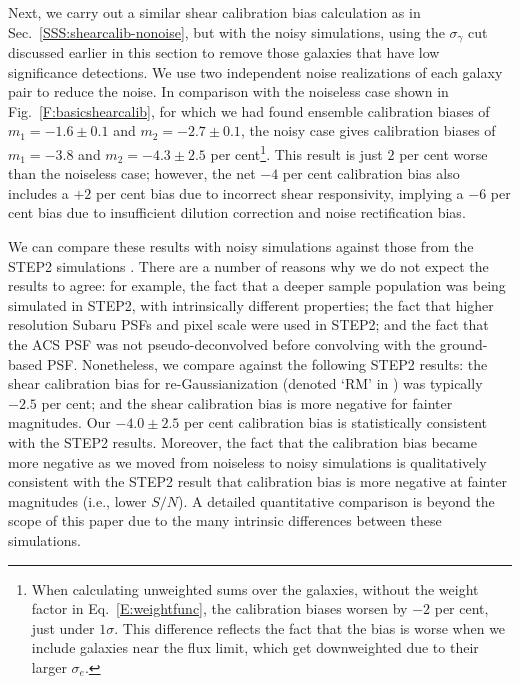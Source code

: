 \documentclass[twocolumn,useAMS,usenatbib]{mn2e}
\newcommand{\newtext}{}
\begin{document}
Next, we carry out a similar shear calibration bias calculation as in
Sec.~\ref{SSS:shearcalib-nonoise}, but with the noisy simulations,
using the $\sigma_\gamma$ cut
discussed earlier in this section to remove those galaxies that have
low significance detections.  %
We use
two independent noise realizations of each galaxy pair to reduce the noise.  In comparison with the
noiseless case shown in Fig.~\ref{F:basicshearcalib}, for which we had
found ensemble calibration biases of $m_1=-1.6 \pm 0.1$  and
$m_2=-2.7\pm 0.1$, the noisy case gives calibration biases of
$m_1=-3.8$ and $m_2=-4.3\pm 2.5$ per cent\footnote{\newtext{When calculating
    unweighted sums over the galaxies, without the weight factor in
    Eq.~\eqref{E:weightfunc}, the calibration biases worsen by $-2$
    per cent, just under $1\sigma$.  This difference reflects 
    the fact that the bias is worse when we include galaxies near the flux limit, which get downweighted due to their
    larger $\sigma_e$.}}.  This result is just $2$ per cent
worse than the noiseless case; however, the net $-4$ per cent
calibration bias also includes a $+2$ per cent bias due
to incorrect shear responsivity, implying a $-6$ per cent bias due to
insufficient dilution correction and noise rectification bias.%

We can compare these results with noisy simulations against those from
the STEP2 simulations \citep{2007MNRAS.376...13M}. There are a number
of reasons why we do not expect the results to agree: for example, the
fact that a deeper sample population was being simulated in STEP2, with
intrinsically different properties; the fact that higher resolution
Subaru PSFs and pixel scale were used in STEP2; and the fact that the ACS PSF was not
pseudo-deconvolved before convolving with the ground-based PSF.
Nonetheless, we compare against the following STEP2 results: the shear
calibration bias for re-Gaussianization (denoted `RM' in \citealt{2007MNRAS.376...13M}) was typically $-2.5$ per cent; and the shear calibration
bias is more negative for fainter magnitudes.  Our $-4.0\pm 2.5$ per
cent calibration bias is statistically consistent with the STEP2
results.  Moreover, the fact that the calibration bias became more
negative as we moved from noiseless to noisy simulations is
qualitatively consistent with the STEP2 result that calibration bias
is more negative at fainter magnitudes (i.e., lower $S/N$).   A
detailed quantitative comparison is beyond the scope of this paper due to the many
intrinsic differences between these simulations.
\end{document}
